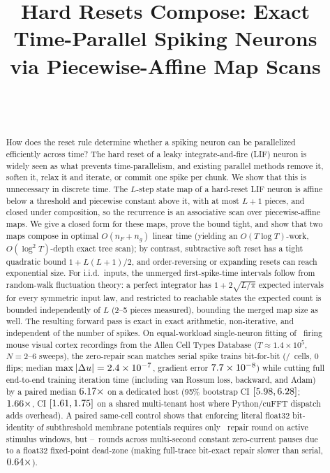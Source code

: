 \documentclass[10pt]{article}
\title{Hard Resets Compose: Exact Time-Parallel Spiking Neurons\\ via Piecewise-Affine Map Scans}
\author{\AUTHORNAME\\ \small \AFFILIATION\\ \small\texttt{\AUTHOREMAIL}}
\date{}
\theoremstyle{remark}
\begin{document}
\maketitle

\begin{abstract}
How does the reset rule determine whether a spiking neuron can be parallelized efficiently across time?
The hard reset of a leaky integrate-and-fire (LIF) neuron is widely seen as what prevents time-parallelism, and existing parallel methods remove it, soften it, relax it and iterate, or commit one spike per chunk.
We show that this is unnecessary in discrete time.
The $L$-step state map of a hard-reset LIF neuron is affine below a threshold and piecewise constant above it, with at most $L+1$ pieces, and closed under composition, so the recurrence is an associative scan over piecewise-affine maps.
We give a closed form for these maps, prove the bound tight, and show that two maps compose in optimal $O(n_F+n_g)$ linear time (yielding an $O(T\log T)$-work, $O(\log^2 T)$-depth exact tree scan); by contrast, subtractive soft reset has a tight quadratic bound $1+L(L+1)/2$, and order-reversing or expanding resets can reach exponential size.
For i.i.d.\ inputs, the unmerged first-spike-time intervals follow from random-walk fluctuation theory: a perfect integrator has $1+2\sqrt{L/\pi}$ expected intervals for every symmetric input law, and restricted to reachable states the expected count is bounded independently of $L$ (2--5 pieces measured), bounding the merged map size as well.
The resulting forward pass is exact in exact arithmetic, non-iterative, and independent of the number of spikes.
On equal-workload single-neuron fitting of \RealAuditCells\ firing mouse visual cortex recordings from the Allen Cell Types Database ($T\approx 1.4\times 10^5$, $N=2$--$6$ sweeps), the zero-repair scan matches serial spike trains bit-for-bit (\RealAuditRZeroSpkEq/\RealAuditCells\ cells, $0$ flips; median $\max|\Delta u|=2.4\times10^{-7}$, gradient error $7.7\times10^{-8}$) while cutting full end-to-end training iteration time (including van Rossum loss, backward, and Adam) by a paired median $6.17\times$ on a dedicated host (95\% bootstrap CI $[5.98,6.28]$; $1.66\times$, CI $[1.61,1.75]$ on a shared multi-tenant host where Python/cuFFT dispatch adds overhead).
A paired same-cell control shows that enforcing literal float32 bit-identity of subthreshold membrane potentials requires only \WinCtrlLateActRepMed\ repair round on active stimulus windows, but \WinCtrlLateSilRepMed--\RealAuditExactItersMed\ rounds across multi-second constant zero-current pauses due to a float32 fixed-point dead-zone (making full-trace bit-exact repair slower than serial, $0.64\times$).

\end{abstract}
\end{document}
